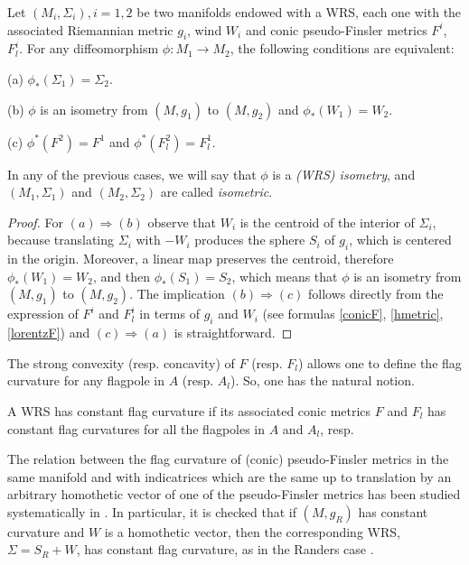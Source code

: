 \documentclass[reqno,10pt]{amsart}
\begin{document}
\begin{lemma}\label{l3.5}  Let $(M_i,\Sigma_i), i=1,2$ be two manifolds endowed with a WRS, each one with the associated Riemannian metric $g_i$,  wind $W_i$ and conic  pseudo-Finsler metrics  $F^i$,  $F^i_l$.  For any diffeomorphism $\phi: M_1\rightarrow M_2$, the following conditions are equivalent: 

 (a)  $\phi_*(\Sigma_1)=\Sigma_2$.


 (b)  $\phi$ is an isometry from $(M, g_1)$ to $(M,g_2)$ and $\phi_*(W_1)=W_2$.
 

 (c)  $\phi^*(F^2)=F^1$  and $\phi^*(F^2_l)=F^1_l$. 

 \smallskip
 
 In any of the previous cases, we will say that  $\phi$ is a {\em (WRS) isometry}, and  $(M_1,\Sigma_1)$ and $(M_2,\Sigma_2)$ are called {\em isometric}. 
\end{lemma}
\begin{proof}
 For $(a)\Rightarrow  (b) $ observe that $W_i$ is the centroid of the interior of $\Sigma_i$, because translating $\Sigma_i$ with $-W_{i}$ produces the  sphere $S_i$ of $g_i$, which is centered in the origin. Moreover, a linear map preserves the centroid, therefore $\phi_*(W_1)=W_2$, and then $\phi_*(S_1)=S_2$, which means that $\phi$ is  an isometry from $(M, g_1)$ to $(M,g_2)$. The implication   $(b)\Rightarrow (c)$   follows directly from the expression of $F^i$ and $F^i_l$ in terms of $g_i$ and $W_i$ (see %
 formulas \eqref{conicF}, \eqref{hmetric}, 
\eqref{lorentzF}) and  $(c)\Rightarrow (a)$  is straightforward. 
\end{proof}
 The strong convexity (resp. concavity)   of $F$ (resp. $F_l$) allows one  to define the flag curvature for any flagpole in $A$ (resp. $A_l$). So, one has the natural notion. 
\begin{defi}
 A WRS has constant flag curvature if its associated conic metrics $F$ and $F_l$ has constant flag curvatures for all the  flagpoles
in $A$ and $A_l$, resp.
 \end{defi}
\begin{rem}\label{rjv}  The relation  between the  flag curvature of  (conic) pseudo-Finsler metrics in the same manifold and with indicatrices which are the same up to translation by an arbitrary homothetic vector of one of the pseudo-Finsler metrics  has been studied systematically in \cite{JV}. In particular, it is checked that if $(M,g_R)$ has constant curvature  and $W$ is a homothetic vector, then the corresponding WRS, $\Sigma=S_R+W$, has constant flag curvature, as in the Randers case \cite[Corollary 5.1]{JV}.
\end{rem}
\end{document}

